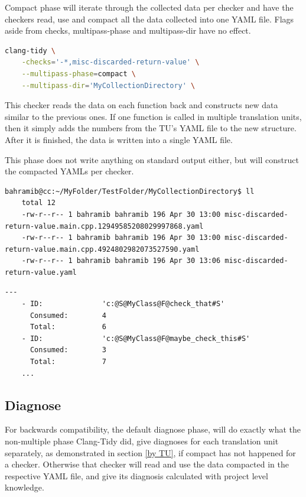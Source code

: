 Compact phase will iterate through the collected data per checker and have the checkers read, use and compact all the data collected
into one YAML file. Flags aside from checks, multipass-phase and multipass-dir have no effect.

\begin{lstlisting}[language={bash}]
	clang-tidy \
	-checks='-*,misc-discarded-return-value' \
	--multipass-phase=compact \
	--multipass-dir='MyCollectionDirectory' \
\end{lstlisting}

This checker reads the data on each function back and constructs new data similar to the previous ones. If one function is called in multiple
translation units, then it simply adds the numbers from the TU's YAML file to the new structure. After it is finished, the data is
written into a single YAML file.
\par This phase does not write anything on standard output either, but will construct the compacted YAMLs per checker.

\begin{lstlisting}[caption={The new file containing the collected data.},captionpos=b]
	bahramib@cc:~/MyFolder/TestFolder/MyCollectionDirectory$ ll
	total 12
	-rw-r--r-- 1 bahramib bahramib 196 Apr 30 13:00 misc-discarded-return-value.main.cpp.12949585208029997868.yaml
	-rw-r--r-- 1 bahramib bahramib 196 Apr 30 13:00 misc-discarded-return-value.main.cpp.4924802982073527590.yaml
	-rw-r--r-- 1 bahramib bahramib 196 Apr 30 13:06 misc-discarded-return-value.yaml
\end{lstlisting}

\begin{lstlisting}[caption={Contents of the compacted file.},captionpos=b]
	---
	- ID:              'c:@S@MyClass@F@check_that#S'
	  Consumed:        4
	  Total:           6
	- ID:              'c:@S@MyClass@F@maybe_check_this#S'
	  Consumed:        3
	  Total:           7
	...
\end{lstlisting}

\subsection{Diagnose}

For backwards compatibility, the default diagnose phase, will do exactly what the non-multiple
phase Clang-Tidy did, give diagnoses for each translation unit separately, as demonstrated in section \cref{by TU},
if compact has not happened for a checker. Otherwise that checker will read and use the data compacted
in the respective YAML file, and give its diagnosis calculated with project level knowledge.

